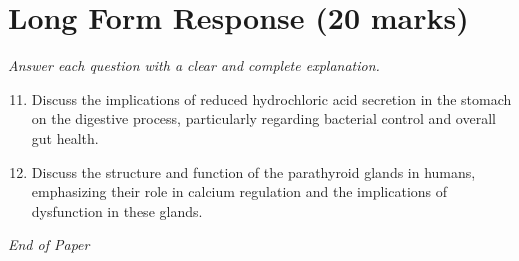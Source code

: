 \documentclass[12pt]{article}
\begin{document}
\section*{Long Form Response (20 marks)}
\textit{Answer each question with a clear and complete explanation.}
\begin{enumerate}[label=\arabic*.]
\setcounter{enumi}{10}
\item Discuss the implications of reduced hydrochloric acid secretion in the stomach on the digestive process, particularly regarding bacterial control and overall gut health.
\item Discuss the structure and function of the parathyroid glands in humans, emphasizing their role in calcium regulation and the implications of dysfunction in these glands.
\end{enumerate}

\vfill
\noindent\textit{End of Paper}
\end{document}
